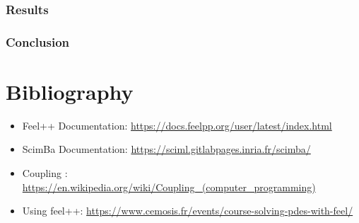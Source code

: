 \documentclass[12pt]{article}
\begin{document}
\newpage

\section{Results}


\newpage

\section{Conclusion}


\newpage

\part*{Bibliography}




\begin{itemize}
    \item Feel++ Documentation: \url{https://docs.feelpp.org/user/latest/index.html}
    \item ScimBa Documentation: \url{https://sciml.gitlabpages.inria.fr/scimba/}
    \item Coupling : \url{https://en.wikipedia.org/wiki/Coupling_(computer_programming)}
    \item Using feel++:
    \url{https://www.cemosis.fr/events/course-solving-pdes-with-feel/}
\end{itemize}
\end{document}
